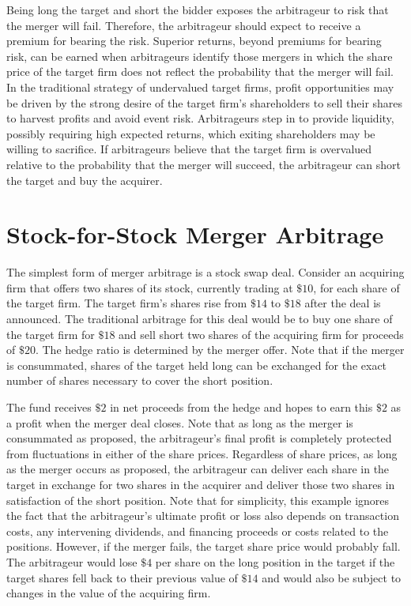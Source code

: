 \documentclass[11pt]{article}
\begin{document}
Being long the target and short the bidder exposes the arbitrageur to risk that the merger will fail. Therefore, the arbitrageur should expect to receive a premium for bearing the risk. Superior returns, beyond premiums for bearing risk, can be earned when arbitrageurs identify those mergers in which the share price of the target firm does not reflect the probability that the merger will fail. In the traditional strategy of undervalued target firms, profit opportunities may be driven by the strong desire of the target firm's shareholders to sell their shares to harvest profits and avoid event risk. Arbitrageurs step in to provide liquidity, possibly requiring high expected returns, which exiting shareholders may be willing to sacrifice. If arbitrageurs believe that the target firm is overvalued relative to the probability that the merger will succeed, the arbitrageur can short the target and buy the acquirer.

\section*{Stock-for-Stock Merger Arbitrage}
The simplest form of merger arbitrage is a stock swap deal. Consider an acquiring firm that offers two shares of its stock, currently trading at $\$ 10$, for each share of the target firm. The target firm's shares rise from $\$ 14$ to $\$ 18$ after the deal is announced. The traditional arbitrage for this deal would be to buy one share of the target firm for $\$ 18$ and sell short two shares of the acquiring firm for proceeds of $\$ 20$. The hedge ratio is determined by the merger offer. Note that if the merger is consummated, shares of the target held long can be exchanged for the exact number of shares necessary to cover the short position.

The fund receives $\$ 2$ in net proceeds from the hedge and hopes to earn this $\$ 2$ as a profit when the merger deal closes. Note that as long as the merger is consummated as proposed, the arbitrageur's final profit is completely protected from fluctuations in either of the share prices. Regardless of share prices, as long as the merger occurs as proposed, the arbitrageur can deliver each share in the target in exchange for two shares in the acquirer and deliver those two shares in satisfaction of the short position. Note that for simplicity, this example ignores the fact that the arbitrageur's ultimate profit or loss also depends on transaction costs, any intervening dividends, and financing proceeds or costs related to the positions. However, if the merger fails, the target share price would probably fall. The arbitrageur would lose $\$ 4$ per share on the long position in the target if the target shares fell back to their previous value of $\$ 14$ and would also be subject to changes in the value of the acquiring firm.
\end{document}
